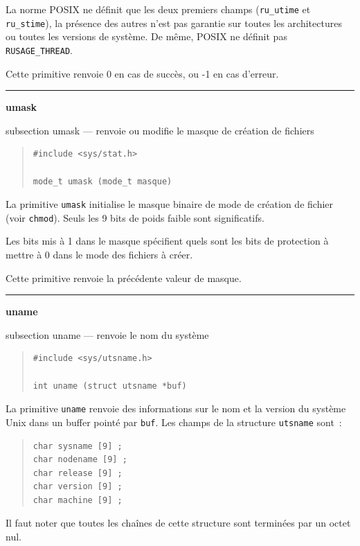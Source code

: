 \documentclass [twoside] {report}
\newcommand {\primitive} [1]
    {
	\phantomsection
	{\large \textbf {#1}}
	\addcontentsline {toc} {subsection} {#1}
    }
\newcommand {\separation}
    {
	\vspace {5mm}
	\nopagebreak
	\hrule
    }
\begin{document}
La norme POSIX ne définit que les deux premiers champs (\texttt
{ru\_utime} et \texttt {ru\_stime}), la présence des autres n'est pas
garantie sur toutes les architectures ou toutes les versions de système.
De même, POSIX ne définit pas \texttt {RUSAGE\_THREAD}.

Cette primitive renvoie 0 en cas de succès, ou -1 en cas d'erreur.



\separation
\primitive {umask} --- renvoie ou modifie le masque de création de fichiers

\begin {quote}
\begin {verbatim}
#include <sys/stat.h>

mode_t umask (mode_t masque)
\end{verbatim}
\end {quote}

La primitive \texttt {umask} initialise le masque
binaire de mode de création de fichier (voir \texttt {chmod}).
Seuls les 9
bits de poids faible sont significatifs.

Les bits mis à 1 dans le masque spécifient quels
sont les bits de protection à mettre à 0 dans le
mode des fichiers à créer.

Cette primitive renvoie la précédente valeur de
masque.




\separation
\primitive {uname} --- renvoie le nom du système

\begin {quote}
\begin {verbatim}
#include <sys/utsname.h>

int uname (struct utsname *buf)
\end{verbatim}
\end {quote}

La primitive \texttt {uname} renvoie des informations
sur le nom et la version du système Unix dans un
buffer pointé par \texttt {buf}. Les champs de la
structure \texttt {utsname} sont~:

\begin {quote}
\begin {verbatim}
char sysname [9] ;
char nodename [9] ;
char release [9] ;
char version [9] ;
char machine [9] ;
\end{verbatim}
\end {quote}

Il faut noter que toutes les chaînes de cette
structure sont terminées par un octet nul.
\end{document}

